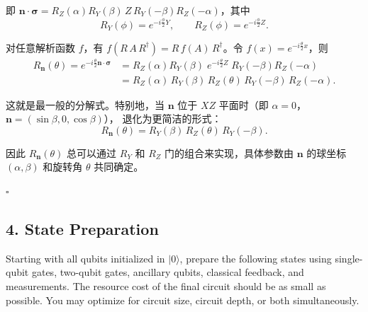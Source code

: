 \documentclass{ctexart}
\newcommand{\ket}[1]{|#1\rangle}
\begin{document}
即 $\mathbf{n}\cdot\boldsymbol{\sigma} = R_Z(\alpha) R_Y(\beta)\, Z\, R_Y(-\beta) R_Z(-\alpha)$，其中
\begin{equation*}
    R_Y(\phi) = e^{-i\frac{\phi}{2}Y}, \qquad
    R_Z(\phi) = e^{-i\frac{\phi}{2}Z}.
\end{equation*}

对任意解析函数 $f$，有 $f(R\,A\,R^\dagger) = R\,f(A)\,R^\dagger$。令 $f(x) = e^{-i\frac{\theta}{2}x}$，则
\begin{align*}
    R_{\mathbf{n}}(\theta) = e^{-i\frac{\theta}{2}\mathbf{n}\cdot\boldsymbol{\sigma}}
    &= R_Z(\alpha) R_Y(\beta)\; e^{-i\frac{\theta}{2}Z}\; R_Y(-\beta) R_Z(-\alpha) \\
    &= R_Z(\alpha)\, R_Y(\beta)\, R_Z(\theta)\, R_Y(-\beta)\, R_Z(-\alpha).
\end{align*}

这就是最一般的分解式。特别地，当 $\mathbf{n}$ 位于 $XZ$ 平面时（即 $\alpha = 0$，$\mathbf{n} = (\sin\beta, 0, \cos\beta)$），
退化为更简洁的形式：
\begin{equation*}
    R_{\mathbf{n}}(\theta) = R_Y(\beta)\, R_Z(\theta)\, R_Y(-\beta).
\end{equation*}

因此 $R_{\mathbf{n}}(\theta)$ 总可以通过 $R_Y$ 和 $R_Z$ 门的组合来实现，具体参数由 $\mathbf{n}$ 的球坐标 $(\alpha, \beta)$ 和旋转角 $\theta$ 共同确定。

\hfill $\square$

\subsection*{4. State Preparation}
Starting with all qubits initialized in $\ket{0}$, prepare the following states using single-qubit gates,
two-qubit gates, ancillary qubits, classical feedback, and measurements. The resource cost
of the final circuit should be as small as possible. You may optimize for circuit size, circuit
depth, or both simultaneously.
\end{document}
